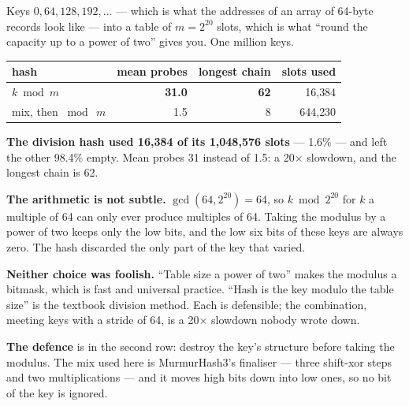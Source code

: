 \begin{worked}
Keys $0, 64, 128, 192, \ldots$ --- which is what the addresses of an array of
64-byte records look like --- into a table of $m = 2^{20}$ slots, which is what
``round the capacity up to a power of two'' gives you. One million keys.

\begin{center}
\begin{tabular}{@{}lrrr@{}}
\toprule
\rowcolor{primary!15}
hash & mean probes & longest chain & slots used \\
\midrule
$k \bmod m$          & \textbf{31.0} & \textbf{62} & 16{,}384 \\
mix, then $\bmod\ m$ &           1.5 &           8 & 644{,}230 \\
\bottomrule
\end{tabular}
\end{center}

\smallskip
\textbf{The division hash used 16{,}384 of its 1{,}048{,}576 slots} --- 1.6\%
--- and left the other 98.4\% empty. Mean probes 31 instead of 1.5: a
20$\times$ slowdown, and the longest chain is 62.

\smallskip
\textbf{The arithmetic is not subtle.} $\gcd(64, 2^{20}) = 64$, so
$k \bmod 2^{20}$ for $k$ a multiple of 64 can only ever produce multiples of
64. Taking the modulus by a power of two keeps only the low bits, and the low
six bits of these keys are always zero. The hash discarded the only part of the
key that varied.

\smallskip
\textbf{Neither choice was foolish.} ``Table size a power of two'' makes the
modulus a bitmask, which is fast and universal practice. ``Hash is the key
modulo the table size'' is the textbook division method. Each is defensible;
the combination, meeting keys with a stride of 64, is a 20$\times$ slowdown
nobody wrote down.

\smallskip
\textbf{The defence} is in the second row: destroy the key's structure before
taking the modulus. The mix used here is MurmurHash3's finaliser --- three
shift-xor steps and two multiplications --- and it moves high bits down into
low ones, so no bit of the key is ignored.
\end{worked}

